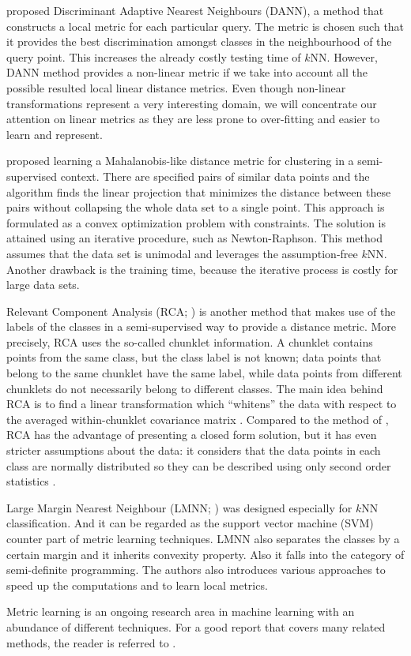 \citet{hastie1996} proposed Discriminant Adaptive Nearest Neighbours (DANN), a method that constructs a local metric for each particular query. The metric is chosen such that it provides the best discrimination amongst classes in the neighbourhood of the query point. This increases the already costly testing time of $k$NN. However, DANN method provides a non-linear metric if we take into account all the possible resulted local linear distance metrics. Even though non-linear transformations represent a very interesting domain, we will concentrate our attention on linear metrics as they are less prone to over-fitting and easier to learn and represent.

\citet{xing2003} proposed learning a Mahalanobis-like distance metric for clustering in a semi-supervised context. There are specified pairs of similar data points and the algorithm finds the linear projection that minimizes the distance between these pairs without collapsing the whole data set to a single point. This approach is formulated as a convex optimization problem with constraints. The solution is attained using an iterative procedure, such as Newton-Raphson. This method assumes that the data set is unimodal and leverages the assumption-free $k$NN. Another drawback is the training time, because the iterative process is costly for large data sets.

Relevant Component Analysis (RCA; \citealp{bar2003, shental2002}) is another method that makes use of the labels of the classes in a semi-supervised way to provide a distance metric. More precisely, RCA uses the so-called chunklet information. A chunklet contains points from the same class, but the class label is not known; data points that belong to the same chunklet have the same label, while data points from different chunklets do not necessarily belong to different classes. The main idea behind RCA is to find a linear transformation which ``whitens'' the data with respect to the averaged within-chunklet covariance matrix \citep{weinberger2009}. Compared to the method of \citet{xing2003}, RCA has the advantage of presenting a closed form solution, but it has even stricter assumptions about the data: it considers that the data points in each class are normally distributed so they can be described using only second order statistics \citep{goldberger2004}.

Large Margin Nearest Neighbour (LMNN; \citealp{weinberger2009}) was designed especially for $k$NN classification. And it can be regarded as the support vector machine (SVM) counter part of metric learning techniques. LMNN also separates the classes by a certain margin and it inherits convexity property. Also it falls into the category of semi-definite programming. The authors also introduces various approaches to speed up the computations and to learn local metrics.

Metric learning is an ongoing research area in machine learning with an abundance of different techniques. For a good report that covers many related methods, the reader is referred to \citep{yang2006}.